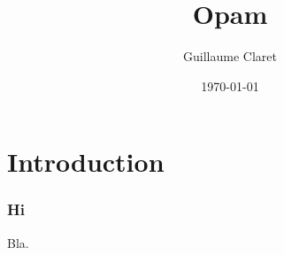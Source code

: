 \documentclass{beamer}
\begin{document}
  \title{Opam}
  \author{Guillaume Claret}
  \date{\today}
  \maketitle

  \section{Introduction}
  \begin{frame}
    \frametitle{Hi}
    Bla.
  \end{frame}  
\end{document}
